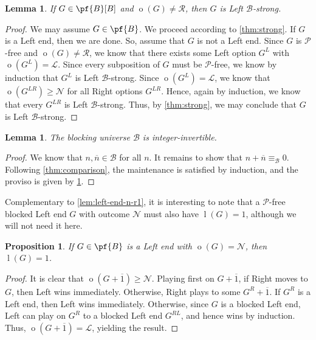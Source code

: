 \documentclass[11pt]{article}
\newtheorem{lemma}[theorem]{Lemma}
\newtheorem{proposition}[theorem]{Proposition}
\theoremstyle{definition}
\DeclareMathOperator{\outcome}{o}
\newcommand{\set}[1]{\mathcal{#1}}
\DeclareMathOperator{\ltp}{l}
\begin{document}
\begin{lemma}
    \label{thm:B-pfree-strong}
    If $G\in\pf{B}[B]$ and $\outcome(G)\neq\mathscr{R}$, then $G$ is Left
    $\set{B}$-strong.
\end{lemma}

\begin{proof}
    We may assume $G\in\pf{B}$. We proceed according to \cref{thm:strong}. If
    $G$ is a Left end, then we are done. So, assume that $G$ is not a Left end.
    Since $G$ is $\mathscr{P}$-free and $\outcome(G)\neq\mathscr{R}$, we know
    that there exists some Left option $G^L$ with $\outcome(G^L)=\mathscr{L}$.
    Since every subposition of $G$ must be $\mathscr{P}$-free, we know by
    induction that $G^L$ is Left $\set{B}$-strong. Since
    $\outcome(G^L)=\mathscr{L}$, we know that $\outcome(G^{LR})\geq\mathscr{N}$
    for all Right options $G^{LR}$. Hence, again by induction, we know that
    every $G^{LR}$ is Left $\set{B}$-strong. Thus, by \cref{thm:strong}, we may
    conclude that $G$ is Left $\set{B}$-strong.
\end{proof}

\begin{lemma}
    \label{lem:B-int-invertible}
    The blocking universe $\set{B}$ is integer-invertible.
\end{lemma}

\begin{proof}
    We know that $n,\overline{n}\in\set{B}$ for all $n$. It remains to show
    that $n+\overline{n}\equiv_\set{B}0$. Following \cref{thm:comparison}, the
    maintenance is satisfied by induction, and the proviso is given by
    \cref{thm:B-pfree-strong}.
\end{proof}

Complementary to \cref{lem:left-end-n-r1}, it is interesting to note that a
$\mathscr{P}$-free blocked Left end $G$ with outcome $\mathscr{N}$ must also
have $\ltp(G)=1$, although we will not need it here.

\begin{proposition}
    If $G\in\pf{B}$ is a Left end with $\outcome(G)=\mathscr{N}$, then
    $\ltp(G)=1$.
\end{proposition}

\begin{proof}
    It is clear that $\outcome(G+\overline{1})\geq\mathscr{N}$. Playing first
    on $G+\overline{1}$, if Right moves to $G$, then Left wins immediately.
    Otherwise, Right plays to some $G^R+\overline{1}$. If $G^R$ is a Left end,
    then Left wins immediately. Otherwise, since $G$ is a blocked Left end,
    Left can play on $G^R$ to a blocked Left end $G^{RL}$, and hence wins by
    induction. Thus, $\outcome(G+\overline{1})=\mathscr{L}$, yielding the
    result.
\end{proof}
\end{document}

